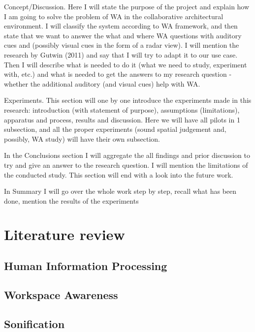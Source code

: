 Concept/Discussion. Here I will state the purpose of the project and explain how I am going to solve the problem of WA in the collaborative architectural environment. I will classify the system according to WA framework, and then state that we want to answer the what and where WA questions with auditory cues and (possibly visual cues in the form of a radar view). I will mention the research by Gutwin (2011) and say that I will try to adapt it to our use case. Then I will describe what is needed to do it (what we need to study, experiment with, etc.) and what is needed to get the answers to my research question - whether the additional auditory (and visual cues) help with WA.

Experiments. This section will one by one introduce the experiments made in this research: introduction (with statement of purpose), assumptions (limitations), apparatus and process, results and discussion. Here we will have all pilots in 1 subsection, and all the proper experiments (sound spatial judgement and, possibly, WA study) will have their own subsection.

In the Conclusions section I will aggregate the all findings and prior discussion to try and give an answer to the research question. I will mention the limitations of the conducted study. This section will end with a look into the future work. 

In Summary I will go over the whole work step by step, recall what has been done, mention the results of the experiments

\chapter{Literature review}
\section{Human Information Processing}
\section{Workspace Awareness}
\section{Sonification}
